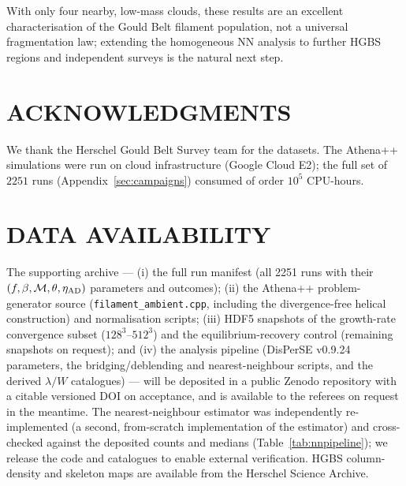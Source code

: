 \documentclass[usenatbib,twoside,twocolumn]{mnras}
\begin{document}
\smallskip\noindent With only four nearby, low-mass clouds, these results are an excellent characterisation of the Gould Belt filament population, not a universal fragmentation law; extending the homogeneous NN analysis to further HGBS regions and independent surveys is the natural next step.

\section*{ACKNOWLEDGMENTS}

We thank the Herschel Gould Belt Survey team for the datasets. The Athena++ simulations were run on cloud infrastructure (Google Cloud E2); the full set of $2251$ runs (Appendix~\ref{sec:campaigns}) consumed of order $10^5$ CPU-hours.

\section*{DATA AVAILABILITY}

The supporting archive --- (i) the full run manifest (all 2251 runs with their $(f,\beta,\mathcal{M},\theta,\eta_{\rm AD})$ parameters and outcomes); (ii) the Athena++ problem-generator source (\texttt{filament\_ambient.cpp}, including the divergence-free helical construction) and normalisation scripts; (iii) HDF5 snapshots of the growth-rate convergence subset ($128^3$--$512^3$) and the equilibrium-recovery control (remaining snapshots on request); and (iv) the analysis pipeline (DisPerSE v0.9.24 parameters, the bridging/deblending and nearest-neighbour scripts, and the derived $\lambda/W$ catalogues) --- will be deposited in a public Zenodo repository with a citable versioned DOI on acceptance, and is available to the referees on request in the meantime. The nearest-neighbour estimator was independently re-implemented (a second, from-scratch implementation of the estimator) and cross-checked against the deposited counts and medians (Table~\ref{tab:nnpipeline}); we release the code and catalogues to enable external verification. HGBS column-density and skeleton maps are available from the Herschel Science Archive.


\appendix
\end{document}
